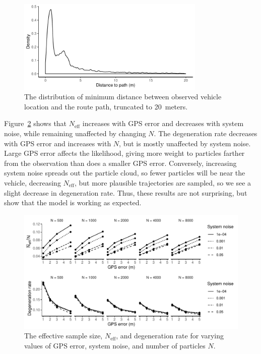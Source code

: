 \begin{figure}[tb]
    \centering
    \includegraphics[width=0.8\textwidth]{figures/04_model_results_dist.pdf}
    \caption{
        The distribution of minimum distance between observed vehicle location
        and the route path, truncated to 20~meters.
    }
    \label{fig:dist_to_route}
\end{figure}


Figure~\ref{fig:perf_stats} shows that $N_\text{eff}$ increases
with GPS error and decreases with system noise,
while remaining unaffected by changing $N$.
The degeneration rate decreases with GPS error and increases with $N$,
but is mostly unaffected by system noise.
Large GPS error affects the likelihood,
giving more weight to particles farther from the observation
than does a smaller GPS error.
Conversely, increasing system noise spreads out the particle cloud,
so fewer particles will be near the vehicle,
decreasing $N_\text{eff}$,
but more plausible trajectories are sampled,
so we see a slight decrease in degeneration rate.
Thus, these results are not surprising, 
but show that the model is working as expected.


\begin{figure}[tb]
    \centering
    \includegraphics[width=\textwidth]{figures/04_model_results_neff.pdf}
    \caption{
        The effective sample size, $N_\text{eff}$,
        and degeneration rate for varying values of GPS error,
        system noise, and number of particles $N$.
    }
    \label{fig:perf_stats}
\end{figure}

